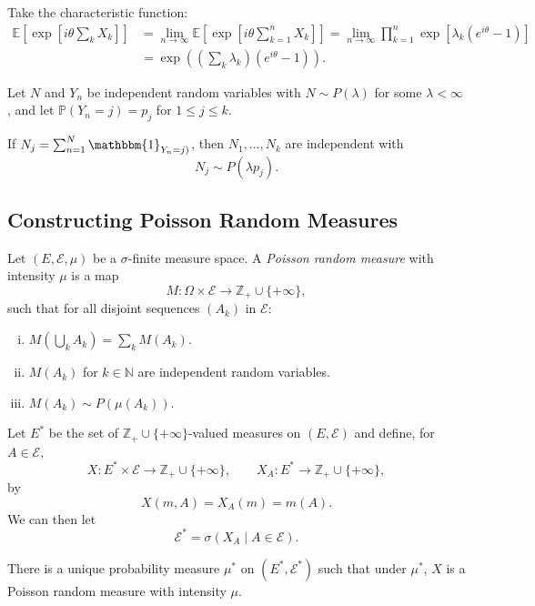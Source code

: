 \documentclass[12pt]{article}
\begin{document}
\begin{proofbox}
	Take the characteristic function:
	\begin{align*}
		\mathbb{E}\left[\exp \left[i \theta \sum_k X_k\right]\right] &= \lim_{n \to \infty} \mathbb{E}\left[ \exp \left[ i\theta \sum_{k = 1}^n X_k \right] \right] = \lim_{n \to \infty} \prod_{k = 1}^n \exp [\lambda_k (e^{i\theta} - 1 )] \\
									     &= \exp \left( \left( \sum_k \lambda_k \right) (e^{i\theta} - 1 ) \right).
	\end{align*}
\end{proofbox}

\begin{proposition}
	Let $N$ and $Y_n$ be independent random variables with $N \sim P(\lambda)$ for some $\lambda < \infty$, and let $\mathbb{P}(Y_n = j) = p_j$ for $1 \leq j \leq k$.

	If $N_j = \sum_{n = 1}^N \mathbbm{1}_{Y_n = j)}$, then $N_1, \ldots, N_k$ are independent with
	\[
	N_j \sim P(\lambda p_j).
	\]
\end{proposition}

\subsection{Constructing Poisson Random Measures}%
\label{sub:conprm}

\begin{definition}
	Let $(E, \mathcal{E}, \mu)$ be a $\sigma$-finite measure space. A \emph{Poisson random measure} with intensity $\mu$ is a map
	\[
	M : \Omega \times \mathcal{E} \to \mathbb{Z}_+ \cup \{+\infty\},
	\]
	such that for all disjoint sequences $(A_k)$ in $\mathcal{E}$:
	\begin{enumerate}[(i)]
		\item $M(\bigcup_k A_k) = \sum_k M(A_k)$.
		\item $M(A_k)$ for $k \in \mathbb{N}$ are independent random variables.
		\item $M(A_k) \sim P(\mu(A_k))$.
	\end{enumerate}
\end{definition}

Let $E^{\ast}$ be the set of $\mathbb{Z}_+ \cup \{+\infty\}$-valued measures on $(E, \mathcal{E})$ and define, for $A \in \mathcal{E}$,
\[
	X : E^{\ast} \times \mathcal{E} \to \mathbb{Z}_+ \cup\{+\infty\}, \qquad X_A : E^{\ast} \to \mathbb{Z}_+ \cup\{+\infty\},
\]
by
\[
X(m, A) = X_A(m) = m(A).
\]
We can then let
\[
\mathcal{E}^{\ast} = \sigma(X_A \mid A \in \mathcal{E}).
\]
\begin{theorem}
	There is a unique probability measure $\mu^{\ast}$ on $(E^{\ast}, \mathcal{E}^{\ast})$ such that under $\mu^{\ast}$, $X$ is a Poisson random measure with intensity $\mu$.
\end{theorem}
\end{document}
